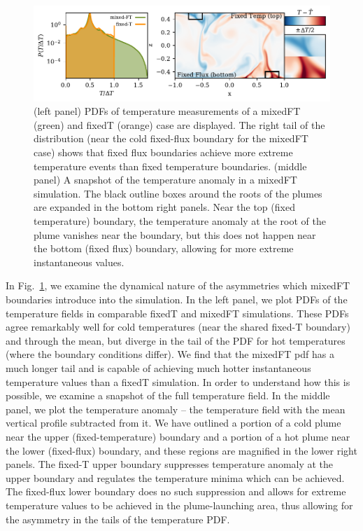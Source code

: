 \documentclass[aps, pre, onecolumn, nofootinbib, notitlepage, groupedaddress, amsfonts, amssymb, amsmath, longbibliography]{revtex4-1}
\begin{document}
\begin{figure}
\includegraphics[width=\textwidth]{./figs/rbc_dynamics_asymmetries.pdf}
\caption{ 
	(left panel) PDFs of temperature measurements of a mixedFT (green) and fixedT (orange) case are displayed.
	The right tail of the distribution (near the cold fixed-flux boundary for the mixedFT case) shows that fixed flux boundaries achieve more extreme temperature events than fixed temperature boundaries.
	(middle panel) A snapshot of the temperature anomaly in a mixedFT simulation.
	The black outline boxes around the roots of the plumes are expanded in the bottom right panels.
	Near the top (fixed temperature) boundary, the temperature anomaly at the root of the plume vanishes near the boundary, but this does not happen near the bottom (fixed flux) boundary, allowing for more extreme instantaneous values.
\label{fig:rbc_dynamics_asymmetries} }
\end{figure}

In Fig.~\ref{fig:rbc_dynamics_asymmetries}, we examine the dynamical nature of the asymmetries which mixedFT boundaries introduce into the simulation.
In the left panel, we plot PDFs of the temperature fields in comparable fixedT and mixedFT simulations.
These PDFs agree remarkably well for cold temperatures (near the shared fixed-T boundary) and through the mean, but diverge in the tail of the PDF for hot temperatures (where the boundary conditions differ).
We find that the mixedFT pdf has a much longer tail and is capable of achieving much hotter instantaneous temperature values than a fixedT simulation.
In order to understand how this is possible, we examine a snapshot of the full temperature field.
In the middle panel, we plot the temperature anomaly -- the temperature field with the mean vertical profile subtracted from it.
We have outlined a portion of a cold plume near the upper (fixed-temperature) boundary and a portion of a hot plume near the lower (fixed-flux) boundary, and these regions are magnified in the lower right panels.
The fixed-T upper boundary suppresses temperature anomaly at the upper boundary and regulates the temperature minima which can be achieved.
The fixed-flux lower boundary does no such suppression and allows for extreme temperature values to be achieved in the plume-launching area, thus allowing for the asymmetry in the tails of the temperature PDF.
\end{document}
